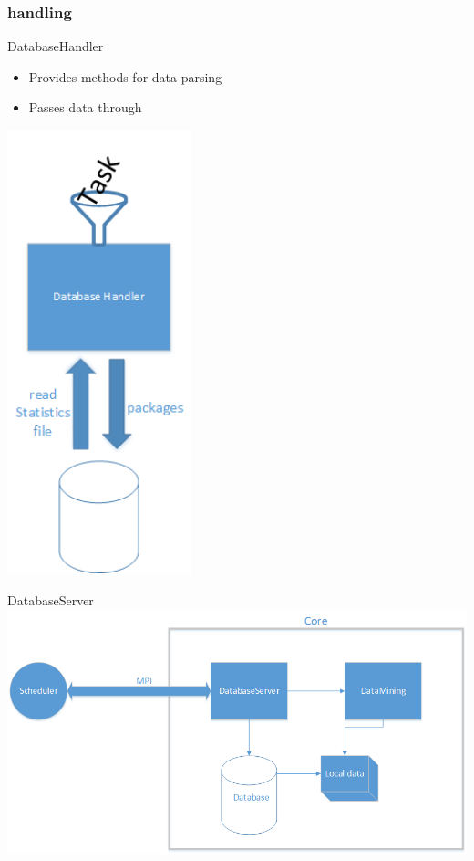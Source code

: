 \subsubsection{handling}
	\begin{frame}{DatabaseHandler}
	
	\begin{minipage}[t]{0.5\textwidth}
	\begin{itemize}
		\item Provides methods for data parsing
		\item Passes data through
	\end{itemize}
	\end{minipage}
	
	\begin{minipage}[t]{0.5\textwidth}
	\includegraphics[width=0.4\textwidth]{images/zeichnunghandler.png}
	\end{minipage}
	
	\end{frame}
	
	\begin{frame}{DatabaseServer}
	\includegraphics[width=1.0\textwidth]{images/Zeichnung6.png}
	\end{frame}
	
